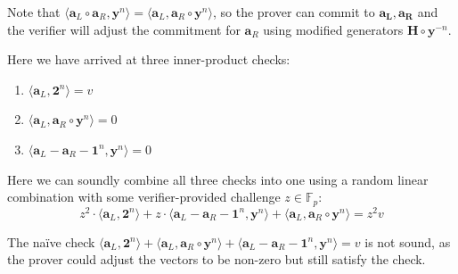 \documentclass[../../book.tex]{subfiles}
\begin{document}
Note that $\langle \mathbf{a}_L \circ \mathbf{a}_R, \mathbf{y}^n \rangle = \langle \mathbf{a}_L, \mathbf{a}_R \circ \mathbf{y}^n \rangle$, so the prover can commit to $\mathbf{a_L, a_R}$ and the verifier will adjust the commitment for $\mathbf{a}_R$ using modified generators $\mathbf{H} \circ \mathbf{y}^{-n}$.

Here we have arrived at three inner-product checks:
\begin{enumerate}
    \item $\langle \mathbf{a}_L, \mathbf{2}^n \rangle = v$
    \item $\langle \mathbf{a}_L, \mathbf{a}_R \circ \mathbf{y}^n \rangle = 0$
    \item $\langle \mathbf{a}_L - \mathbf{a}_R - \mathbf{1}^n, \mathbf{y}^n \rangle = 0$
\end{enumerate}

Here we can soundly combine all three checks into one using a random linear combination with some verifier-provided challenge $z \in \mathbb{F}_p$:
$$z^2 \cdot \langle \mathbf{a}_L, \mathbf{2}^n \rangle + z \cdot \langle \mathbf{a}_L - \mathbf{a}_R - \mathbf{1}^n, \mathbf{y}^n \rangle + \langle \mathbf{a}_L, \mathbf{a}_R \circ \mathbf{y}^n \rangle = z^2v$$

\begin{remark}
    The naïve check $\langle \mathbf{a}_L, \mathbf{2}^n \rangle + \langle \mathbf{a}_L, \mathbf{a}_R \circ \mathbf{y}^n \rangle + \langle \mathbf{a}_L - \mathbf{a}_R - \mathbf{1}^n, \mathbf{y}^n \rangle = v$ is not sound, as the prover could adjust the vectors to be non-zero but still satisfy the check.
\end{remark}
\end{document}
